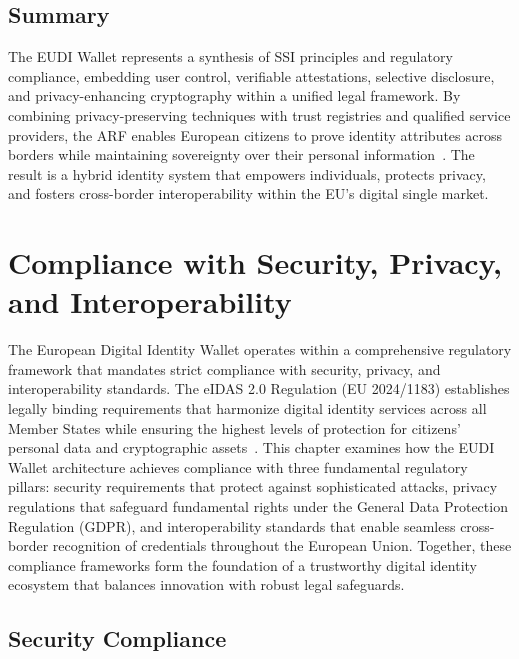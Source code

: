 \documentclass[sigconf,balance,nonacm,authordraft]{acmart}
\begin{document}
\subsection{Summary}

The EUDI Wallet represents a synthesis of SSI principles and regulatory compliance, embedding user control, verifiable attestations, selective disclosure, and privacy-enhancing cryptography within a unified legal framework. By combining privacy-preserving techniques with trust registries and qualified service providers, the ARF enables European citizens to prove identity attributes across borders while maintaining sovereignty over their personal information~\cite{EU_ARF2024,EU_eIDAS2024}. The result is a hybrid identity system that empowers individuals, protects privacy, and fosters cross-border interoperability within the EU's digital single market.
\section{Compliance with Security, Privacy, and Interoperability}
\label{sec:compliance}

The European Digital Identity Wallet operates within a comprehensive regulatory framework that mandates strict compliance with security, privacy, and interoperability standards. The eIDAS 2.0 Regulation (EU 2024/1183) establishes legally binding requirements that harmonize digital identity services across all Member States while ensuring the highest levels of protection for citizens' personal data and cryptographic assets~\cite{EU_eIDAS2024}. This chapter examines how the EUDI Wallet architecture achieves compliance with three fundamental regulatory pillars: security requirements that protect against sophisticated attacks, privacy regulations that safeguard fundamental rights under the General Data Protection Regulation (GDPR), and interoperability standards that enable seamless cross-border recognition of credentials throughout the European Union. Together, these compliance frameworks form the foundation of a trustworthy digital identity ecosystem that balances innovation with robust legal safeguards.

\subsection{Security Compliance}
\end{document}
